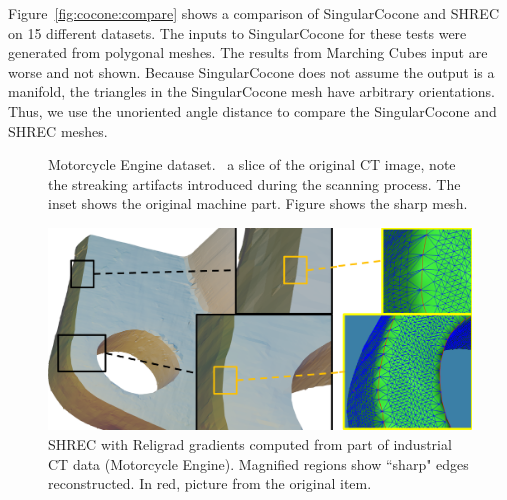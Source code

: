 Figure~\ref{fig:cocone:compare} shows a comparison
of SingularCocone and SHREC on 15 different datasets. 
The inputs to SingularCocone for these tests were generated 
from polygonal meshes. 
The results from Marching Cubes input are worse and not shown.
Because SingularCocone does not assume the output is a manifold,
the triangles in the SingularCocone mesh have arbitrary orientations.
Thus, we use the unoriented angle distance
to compare the SingularCocone and SHREC meshes.


\begin{figure}[t]
	\centering
	\caption{Motorcycle Engine dataset.~\protect{} a slice of the original CT image, note the streaking artifacts introduced during the scanning process.
		The inset shows the original machine part. Figure \protect{} shows the sharp mesh.}
	\label{fig:ict:engineA}
\end{figure}


\begin{figure}[t]
\centering
	\includegraphics[width=\linewidth]{images/ictsetA_3.eps}
	\caption{SHREC with Religrad gradients computed from part of industrial CT data (Motorcycle Engine). Magnified regions show ``sharp" edges reconstructed. In red, picture from the original item.} \label{fig:ict:engineB}
\end{figure}


